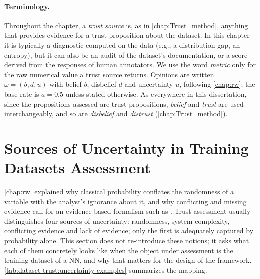 \paragraph{Terminology.}
Throughout the chapter, a \emph{trust source} is, as in \cref{chap:Trust_method}, anything that provides evidence for a trust proposition about the dataset. In this chapter it is typically a diagnostic computed on the data (e.g., a distribution gap, an entropy), but it can also be an audit of the dataset's documentation, or a score derived from the responses of human annotators. We use the word \emph{metric} only for the raw numerical value a trust source returns. Opinions are written $\omega = (b, d, u)$ with belief $b$, disbelief $d$ and uncertainty $u$, following \cref{chap:rw}; the base rate is $a = 0.5$ unless stated otherwise. As everywhere in this dissertation, since the propositions assessed are trust propositions, \emph{belief} and \emph{trust} are used interchangeably, and so are \emph{disbelief} and \emph{distrust} (\cref{chap:Trust_method}).

\section{Sources of Uncertainty in Training Datasets Assessment}
\label{sec:dataset-trust:uncertainty}

\cref{chap:rw} explained why classical probability conflates the randomness of a variable with the analyst's ignorance about it, and why conflicting and missing evidence call for an evidence-based formalism such as . Trust assessment usually distinguishes four sources of uncertainty: randomness, system complexity, conflicting evidence and lack of evidence; only the first is adequately captured by probability alone. This section does not re-introduce these notions; it asks what each of them concretely looks like when the object under assessment is the training dataset of a \ac{NN}, and why that matters for the design of the framework. \cref{tab:dataset-trust:uncertainty-examples} summarizes the mapping.

